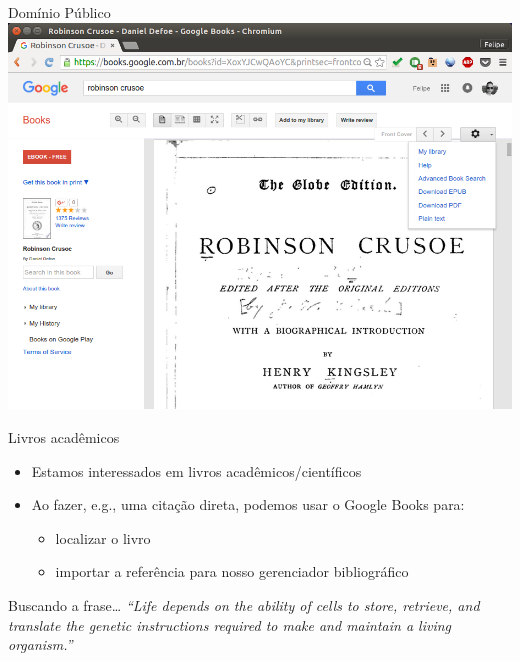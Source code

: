 \documentclass{beamer}
\begin{document}
\begin{frame}{Domínio Público}
  \centering
  \includegraphics[height=.85\textheight]{Busca/gbooks-publicdomain}
\end{frame}

\begin{frame}{Livros acadêmicos}
  \begin{itemize}
    \footnotesize
  \item Estamos interessados em livros acadêmicos/científicos
  \item Ao fazer, e.g., uma citação direta, podemos usar o Google
    Books para:
    \begin{itemize}
      \scriptsize
    \item localizar o livro
    \item importar a referência para nosso gerenciador bibliográfico
    \end{itemize}
  \end{itemize}
  \begin{exampleblock}{Buscando a frase\ldots}
    \tiny
    \em
    ``Life depends on the ability of cells to store, retrieve, and
    translate the genetic instructions required to make and maintain a
    living organism.''
  \end{exampleblock}
\end{frame}
\end{document}
